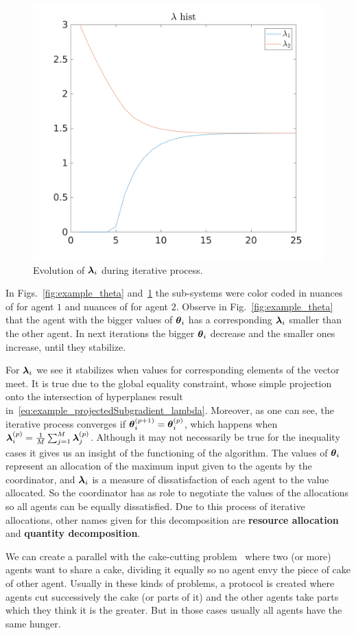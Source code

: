 \documentclass[../main.tex]{subfiles}
\begin{document}
\begin{figure}[h]
  \centering
  \includegraphics[width=.5\textwidth]{../img/example_lambda.png}
  \caption{Evolution of $\boldsymbol{\lambda}_i$ during iterative process. }\label{fig:example_lambda}
\end{figure}
In Figs.~\ref{fig:example_theta} and~\ref{fig:example_lambda} the sub-systems were color coded in nuances of  for agent $1$ and nuances of  for agent $2$.
Observe in Fig.~\ref{fig:example_theta} that the agent with the bigger values of $\boldsymbol{\theta}_i$ has a corresponding $\boldsymbol{\lambda}_i$ smaller than the other agent.
In next iterations the bigger $\boldsymbol{\theta}_i$ decrease and the smaller ones increase, until they stabilize.

For $\boldsymbol{\lambda}_i$ we see it stabilizes when values for corresponding elements of the vector meet.
It is true due to the global equality constraint, whose simple projection onto the intersection of hyperplanes result in~\eqref{eq:example_projectedSubgradient_lambda}.
Moreover, as one can see, the iterative process converges if ${\boldsymbol{\theta}_i^{(p+1)}=\boldsymbol{\theta}_i^{(p)}}$, which happens when ${\boldsymbol{\lambda}_i^{(p)}=\frac{1}{M}\sum_{j=1}^{M}\boldsymbol{\lambda}_j^{(p)}}$.
Although it may not necessarily be true for the inequality cases it gives us an insight of the functioning of the algorithm.
The values of $\boldsymbol{\theta}_i$ represent an allocation of the maximum input given to the agents by the coordinator, and $\boldsymbol{\lambda}_i$ is a measure of dissatisfaction of each agent to the value allocated.
So the coordinator has as role to negotiate the values of the allocations so all agents can be equally dissatisfied.
Due to this process of iterative allocations, other names given for this decomposition are \textbf{resource allocation} and \textbf{quantity decomposition}.

We can create a parallel with the cake-cutting problem~\cite{BramsTaylor1995} where two (or more) agents want to share a cake, dividing it equally so no agent envy the piece of cake of other agent.
Usually in these kinds of problems, a protocol is created where agents cut successively the cake (or parts of it) and the other agents take parts which they think it is the greater.
But in those cases usually all agents have the same hunger.
\end{document}
